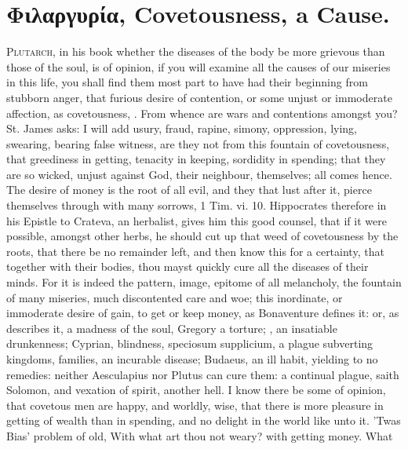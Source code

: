 {%
\section{\textgreek{Φιλαργυρία}, Covetousness, a Cause.}

\lettrine{P}{lutarch}, in his book whether the diseases of the body be more
grievous than those of the soul, is of opinion, if you will examine all
the causes of our miseries in this life, you shall find them most part
to have had their beginning from stubborn anger, that furious desire of
contention, or some unjust or immoderate affection, as covetousness,
\etc{}. From whence are wars and contentions amongst you? St. James
asks: I will add usury, fraud, rapine, simony, oppression, lying,
swearing, bearing false witness, \etc{} are they not from this fountain of
covetousness, that greediness in getting, tenacity in keeping,
sordidity in spending; that they are so wicked, unjust against
God, their neighbour, themselves; all comes hence. The desire of money
is the root of all evil, and they that lust after it, pierce themselves
through with many sorrows, 1 Tim. vi. 10. Hippocrates therefore in his
Epistle to Crateva, an herbalist, gives him this good counsel, that if
it were possible,  amongst other herbs, he should cut up that
weed of covetousness by the roots, that there be no remainder left, and
then know this for a certainty, that together with their bodies, thou
mayst quickly cure all the diseases of their minds. For it is indeed
the pattern, image, epitome of all melancholy, the fountain of many
miseries, much discontented care and woe; this inordinate, or
immoderate desire of gain, to get or keep money, as Bonaventure
defines it: or, as \Austin{} describes it, a madness of the soul, Gregory
a torture; \Chrysostom{}, an insatiable drunkenness; Cyprian, blindness,
speciosum supplicium, a plague subverting kingdoms, families, an
incurable disease; Budaeus, an ill habit, yielding to no
remedies: neither Aesculapius nor Plutus can cure them: a continual
plague, saith Solomon, and vexation of spirit, another hell. I know
there be some of opinion, that covetous men are happy, and worldly,
wise, that there is more pleasure in getting of wealth than in
spending, and no delight in the world like unto it. 'Twas Bias'
problem of old, With what art thou not weary? with getting money. What
}
